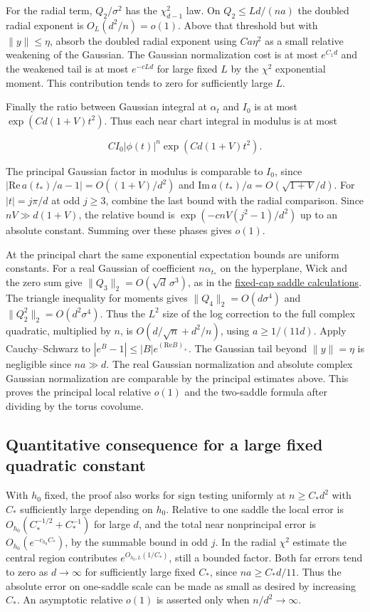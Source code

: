 For the radial term, $Q_2/\sigma^2$ has the $\chi^2_{d-1}$ law. On $Q_2\le Ld/(na)$ the doubled radial exponent is $O_L(d^2/n)=o(1)$. Above that threshold but with $\|y\|\le\eta$, absorb the doubled radial exponent using $Ca\eta^2$ as a small relative weakening of the Gaussian. The Gaussian normalization cost is at most $e^{C_1d}$ and the weakened tail is at most $e^{-cLd}$ for large fixed $L$ by the $\chi^2$ exponential moment. This contribution tends to zero for sufficiently large $L$.

Finally the ratio between Gaussian integral at $\alpha_t$ and $I_0$ is at most $\exp(Cd(1+V)t^2)$. Thus each near chart integral in modulus is at most

\begin{equation*}
C I_0|\phi(t)|^n\exp(Cd(1+V)t^2).
\end{equation*}

The principal Gaussian factor in modulus is comparable to $I_0$, since $|\mathrm{Re}\,a(t_*)/a-1|=O((1+V)/d^2)$ and $\mathrm{Im}\,a(t_*)/a=O(\sqrt{1+V}/d)$. For $|t|=j\pi/d$ at odd $j\ge3$, combine the last bound with the radial comparison. Since $nV\gg d(1+V)$, the relative bound is $\exp(-c n V(j^2-1)/d^2)$ up to an absolute constant. Summing over these phases gives $o(1)$.

At the principal chart the same exponential expectation bounds are uniform constants. For a real Gaussian of coefficient $n\alpha_{t_*}$ on the hyperplane, Wick and the zero sum give $\|Q_3\|_2=O(\sqrt d\,\sigma^3)$, as in the \href{https://github.com/ProgramComputer/open-math-research/blob/f7e10f84dd21fec44ca58c60bae0879d12ebd89b/topics/balanced-arrays/fixed-cap/tall-sparse-transverse-saddle.md}{fixed-cap saddle calculations}. The triangle inequality for moments gives $\|Q_4\|_2=O(d\sigma^4)$ and $\|Q_2^2\|_2=O(d^2\sigma^4)$. Thus the $L^2$ size of the log correction to the full complex quadratic, multiplied by $n$, is $O(d/\sqrt n+d^2/n)$, using $a\ge1/(11d)$. Apply Cauchy--Schwarz to $|e^B-1|\le|B|e^{(\mathrm{Re} B)_+}$. The Gaussian tail beyond $\|y\|=\eta$ is negligible since $na\gg d$. The real Gaussian normalization and absolute complex Gaussian normalization are comparable by the principal estimates above. This proves the principal local relative $o(1)$ and the two-saddle formula after dividing by the torus covolume.


\subsection{Quantitative consequence for a large fixed quadratic constant}

With $h_0$ fixed, the proof also works for sign testing uniformly at $n\ge C_*d^2$ with $C_*$ sufficiently large depending on $h_0$. Relative to one saddle the local error is $O_{h_0}(C_*^{-1/2}+C_*^{-1})$ for large $d$, and the total near nonprincipal error is $O_{h_0}(e^{-c_{h_0}C_*})$, by the summable bound in odd $j$. In the radial $\chi^2$ estimate the central region contributes $e^{O_{h_0,L}(1/C_*)}$, still a bounded factor. Both far errors tend to zero as $d\to\infty$ for sufficiently large fixed $C_*$, since $na\ge C_*d/11$. Thus the absolute error on one-saddle scale can be made as small as desired by increasing $C_*$. An asymptotic relative $o(1)$ is asserted only when $n/d^2\to\infty$.
